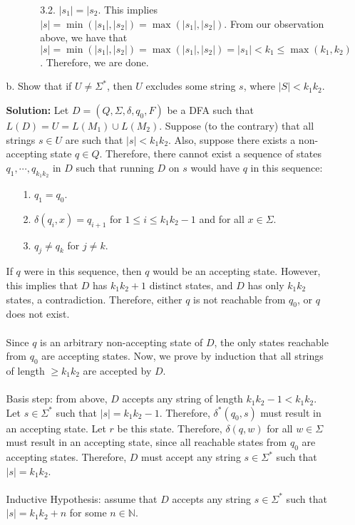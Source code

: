 \begin{enumerate}
\begin{enumerate}
\begin{enumerate}
\begin{enumerate}
\item[3.2.] $|s_1| = |s_2$. This implies $|s| = \min(|s_1|, |s_2|) = \max(|s_1|, |s_2|)$. From our observation above, we have that $|s| = \min(|s_1|, |s_2|) = \max(|s_1|, |s_2|) = |s_1| < k_1 \le \max(k_1, k_2)$. Therefore, we are done.
\end{enumerate}
\end{enumerate}

\item[b.]Show that if $U \ne \Sigma^*$, then $U$ excludes some string $s$, where $|S| < k_1k_2$.

\textbf{Solution:} Let $D = (Q, \Sigma, \delta, q_0, F)$ be a DFA such that $L(D) = U = L(M_1) \cup L(M_2)$. Suppose (to the contrary) that all strings $s \in U$ are such that $|s| < k_1k_2$. Also, suppose there exists a non-accepting state $q \in Q$. Therefore, there cannot exist a sequence of states $q_1, \cdots, q_{k_1k_2}$ in $D$ such that running $D$ on $s$ would have $q$ in this sequence:
\begin{enumerate}
\item[1.]$q_1 = q_0$.
\item[2.]$\delta(q_i, x) = q_{i+1}$ for $1 \le i \le k_1k_2-1$ and for all $x \in \Sigma$.
\item[3.]$q_j \ne q_k$ for $j \ne k$.
\end{enumerate}
If $q$ were in this sequence, then $q$ would be an accepting state. However, this implies that $D$ has $k_1k_2+1$ distinct states, and $D$ has only $k_1k_2$ states, a contradiction. Therefore, either $q$ is not reachable from $q_0$, or $q$ does not exist. 
\\ \\
Since $q$ is an arbitrary non-accepting state of $D$, the only states reachable from $q_0$ are accepting states. Now, we prove by induction that all strings of length $\ge k_1k_2$ are accepted by $D$.
\\ \\
Basis step: from above, $D$ accepts any string of length $k_1k_2 - 1 < k_1k_2$. Let $s \in \Sigma^*$ such that $|s| = k_1k_2 - 1$. Therefore, $\delta^*(q_0, s)$ must result in an accepting state. Let $r$ be this state. Therefore, $\delta(q, w)$ for all $w \in \Sigma$ must result in an accepting state, since all reachable states from $q_0$ are accepting states. Therefore, $D$ must accept any string $s \in \Sigma^*$ such that $|s| = k_1k_2$. 
\\ \\
Inductive Hypothesis: assume that $D$ accepts any string $s \in \Sigma^*$ such that $|s| = k_1k_2 + n$ for some $n \in \mathbb{N}$. 

\end{enumerate}
\end{enumerate}
